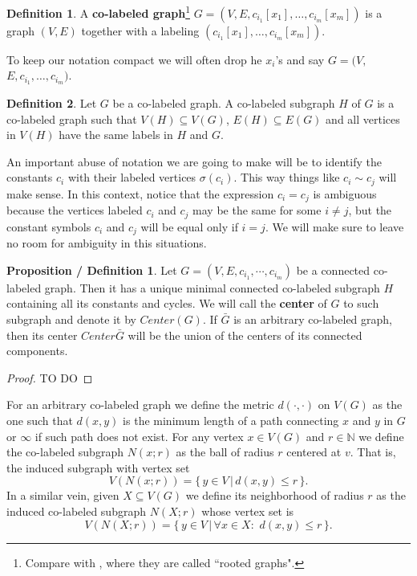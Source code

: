 \documentclass[11pt,notitlepage]{report}
\theoremstyle{definition}
\newtheorem{definition}{Definition}[chapter]
\newtheorem{propdef}{Proposition / Definition}[chapter]
\newcommand{\N}{\mathbb{N}}
\newcommand{\clist}{c_{i_1}, \cdots, c_{i_m}}
\begin{document}
\begin{definition} 
	A \textbf{co-labeled graph}\footnote{
		Compare with \cite{lynch1992probabilities}, where they are called ``rooted graphs". 
		}
	$G=(V,E,c_{i_1}[x_1],\dots, c_{i_m}[x_m])$ 
	is a graph $(V,E)$ together with a labeling 
	$(c_{i_1}[x_1],\dots, c_{i_m}[x_m])$. 
\end{definition}

To keep our notation compact we will often drop 
he $x_i$'s and say $G=(V,$ $E,c_{i_1},\dots, c_{i_m})$. \par

\begin{definition}
Let $G$ be a co-labeled graph. A co-labeled subgraph $H$ of $G$ is
a co-labeled graph such that $V(H)\subseteq V(G)$, $E(H)\subseteq E(G)$ and 
all vertices in $V(H)$ have the same labels in $H$ and $G$. 
\end{definition}


An important abuse of notation we are going to make
will be to identify the constants $c_i$ with their labeled
vertices $\sigma(c_i)$. This way things like $c_i\sim c_j$ 
will make sense. In this context, notice that the expression
$c_i=c_j$ is ambiguous because the vertices labeled $c_i$ and $c_j$ 
may be the same for some $i\neq j$, but 
the constant symbols $c_i$ and $c_j$ will be equal only if $i=j$. 
We will make sure to leave no room for ambiguity in this situations. \par


\begin{propdef}
	Let $G=(V,E,\clist)$ be a connected co-labeled graph. Then it has a unique minimal
	connected co-labeled subgraph $H$ containing all its constants and cycles.
	We will call the \textbf{center} of $G$ to such subgraph and denote it by $Center(G)$.
	If $\bar{G}$ is an arbitrary co-labeled graph, then its center $Center{\bar{G}}$ will
	be the union of the centers of its connected components. 
\end{propdef}
\begin{proof}
	TO DO
\end{proof}

For an arbitrary co-labeled graph we define the metric $d(\cdot,\cdot)$ on $V(G)$ 
as the one such that $d(x,y)$ is the minimum length of a path connecting
$x$ and $y$ in $G$ or $\infty$ if such path does not exist. 
For any vertex $x\in V(G)$ and $r\in \N$ we define the co-labeled
subgraph $N(x;r)$ as the ball of radius $r$ centered at $v$. 
That is, the induced subgraph with vertex set
\[ V(N(x;r))= \{\, y\in V \, | \, d(x,y)\leq  r \,	\}.\] 
In a similar vein, given $X\subseteq V(G)$ we define its neighborhood of radius $r$ as
the induced co-labeled subgraph $N(X;r)$ whose vertex set is
\[ V(N(X;r))= \{\, y\in V \, | \, \forall x\in X: \, \,  d(x,y)\leq  r \,	\}.\]  
\par
\end{document}
